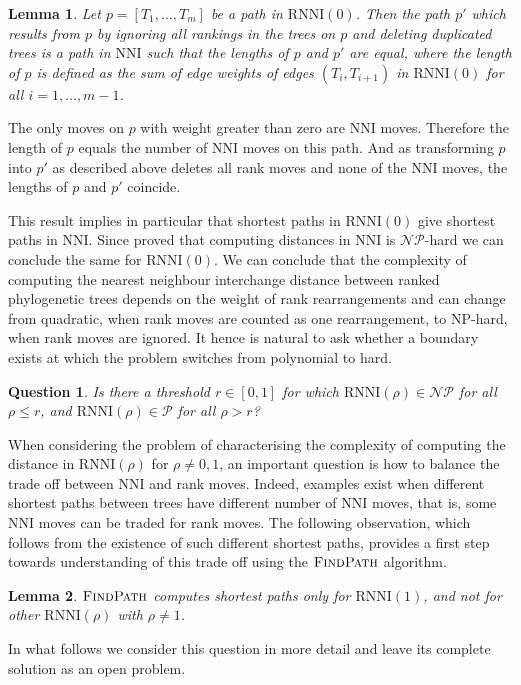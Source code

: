 \documentclass[11pt]{amsart}
\newtheorem{lemma}{Lemma}
\newtheorem{question}{Question}
\newcommand{\rnni}{\mathrm{RNNI}}
\newcommand{\findpath}{\textsc{FindPath}}
\newcommand{\nni}{\mathrm{NNI}}
\newcommand{\fp}{\mathrm{FP}}
\newcommand{\np}{\mathcal{NP}}
\newcommand{\p}{\mathcal{P}}
\newcommand{\summary}[1]{} %
\begin{document}
\begin{lemma}
Let $p = [T_1, \ldots, T_m]$ be a path in $\rnni(0)$.
Then the path $p'$ which results from $p$ by ignoring all rankings in the trees on $p$ and deleting duplicated trees is a path in $\nni$ such that the lengths of $p$ and $p'$ are equal, where the length of $p$ is defined as the sum of edge weights of edges $(T_i,T_{i+1})$ in $\rnni(0)$ for all $i = 1, \ldots, m-1$.
\end{lemma}

\proof
The only moves on $p$ with weight greater than zero are $\nni$ moves.
Therefore the length of $p$ equals the number of $\nni$ moves on this path.
And as transforming $p$ into $p'$ as described above deletes all rank moves and none of the $\nni$ moves, the lengths of $p$ and $p'$ coincide.
\endproof

This result implies in particular that shortest paths in $\rnni(0)$ give shortest paths in $\nni$.
Since \textcite{Dasgupta2000-xa} proved that computing distances in $\nni$ is $\np$-hard we can conclude the same for $\rnni(0)$.
We can conclude that the complexity of computing the nearest neighbour interchange distance between ranked phylogenetic trees depends on the weight of rank rearrangements and can change from quadratic, when rank moves are counted as one rearrangement, to NP-hard, when rank moves are ignored.
It hence is natural to ask whether a boundary exists at which the problem switches from polynomial to hard.

\begin{question}
Is there a threshold $r \in [0,1]$ for which $\rnni(\rho) \in \np$ for all $\rho \leq r$, and $\rnni(\rho) \in \p$ for all $\rho > r$?
\end{question}

\summary{Rank moves and $\nni$ moves can appear in different proportions on shortest paths and this is related to $\fp$ not computing shortest paths if $\rho \neq 1$}
When considering the problem of characterising the complexity of computing the distance in $\rnni(\rho)$ for $\rho \neq 0,1$, an important question is how to balance the trade off between $\nni$ and rank moves.
Indeed, examples exist when different shortest paths between trees have different number of $\nni$ moves, that is, some $\nni$ moves can be traded for rank moves.
The following observation, which follows from the existence of such different shortest paths, provides a first step towards understanding of this trade off using the $\findpath$ algorithm.

\begin{lemma}
	$\findpath$ computes shortest paths only for $\rnni(1)$, and not for other $\rnni(\rho)$ with $\rho \neq 1$.
\end{lemma}


In what follows we consider this question in more detail and leave its complete solution as an open problem.

\newpage


\printbibliography
\end{document}
